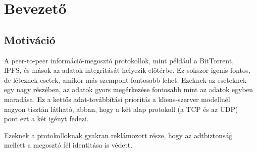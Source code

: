\chapter{Bevezető}\label{ch:BEV}

\section{Motiváció}\label{sec:BEV:mot}

A peer-to-peer információ-megosztó protokollok,
mint például a BitTorrent, IPFS, és mások az
adatok integritását helyezik előtérbe. Ez
sokszor igenis fontos, de léteznek esetek,
amikor más szempont fontosabb lehet. Ezeknek az
eseteknek egy nagy részében, az adatok gyors
megérkezése fontosabb mint az adatok egyben
maradása. Ez a kettős adat-továbbítási
prioritás a kliens-szerver modellnél nagyon
tisztán látható, abban, hogy a két alap
protokoll (a TCP és az UDP) pont ezt a két
igényt fedezi.

Ezeknek a protokolloknak gyakran reklámozott
része, hogy az adtbiztonság mellett a megosztó
fél identitása is védett. 

